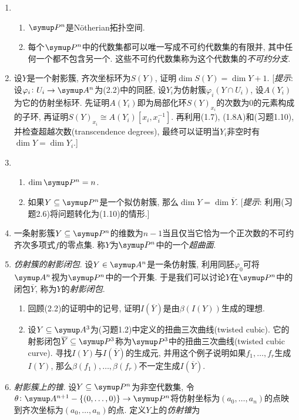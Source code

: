 \begin{enumerate}
\begin{enumerate}
        \end{enumerate}
    \item
        \begin{enumerate}
            \item $\Pn$是N\"otherian拓扑空间.
            \item 每个$\Pn$中的代数集都可以唯一写成不可约代数集的有限并, 其中任何一个都不包含另一个. 这些不可约代数集称为这个代数集的\emph{不可约分支}.
        \end{enumerate}
    \item 设$Y$是一个射影簇, 齐次坐标环为$S(Y)$, 证明$\dim S(Y) = \dim Y + 1$. [\emph{提示}: 设$\varphi_i\colon U_i\to \An$为(2.2)中的同胚, 设$Y_i$为仿射簇$\varphi_i(Y\cap U_i)$, 设$A(Y_i)$为它的仿射坐标环. 先证明$A(Y_i)$即为局部化环$S(Y)_{x_i}$的次数为0的元素构成的子环, 再证明$S(Y)_{x_i}\cong A(Y_i)[x_i, x_i^{-1}]$. 再利用(1.7), (1.8A)和(习题1.10), 并检查超越次数(transcendence degrees), 最终可以证明当$Y_i$非空时有$\dim Y = \dim Y_i$.]
    \item
        \begin{enumerate}
            \item $\dim \Pn = n$.
            \item 如果$Y\subseteq\Pn$是一个拟仿射簇, 那么$\dim Y = \dim \overline{Y}$. [\emph{提示}: 利用(习题2.6)将问题转化为(1.10)的情形.]
        \end{enumerate}
    \item 一条射影簇$Y\subseteq\Pn$的维数为$n-1$当且仅当它恰为一个正次数的不可约齐次多项式$f$的零点集. 称$Y$为$\Pn$中的一个\emph{超曲面}.
    \item \emph{仿射簇的射影闭包}. 设$Y\in\An$是一条仿射簇, 利用同胚$\varphi_0$可将$\An$视为$\Pn$中的一个开集. 于是我们可以讨论$Y$在$\Pn$中的闭包$\overline{Y}$, 称为$Y$的\emph{射影闭包}.
        \begin{enumerate}
            \item 回顾(2.2)的证明中的记号, 证明$I(\overline{Y})$是由$\beta(I(Y))$生成的理想.
            \item 设$Y\subseteq\AA{3}$为(习题1.2)中定义的扭曲三次曲线(twisted cubic). 它的射影闭包$\overline{Y}\subseteq\PP{3}$称为$\PP{3}$中的扭曲三次曲线(twisted cubic curve). 寻找$I(Y)$与$I(\overline{Y})$的生成元, 并用这个例子说明如果$f_1, \dotsc, f_r$生成$I(Y)$, 那么$\beta(f_1), \dotsc, \beta(f_r)$不一定生成$I(\overline{Y})$.
        \end{enumerate}
    \item \emph{射影簇上的锥}. 设$Y\subseteq\Pn$为非空代数集, 令$\theta\colon\AA{n+1}-\{(0, \dotsc, 0)\}\to\Pn$将仿射坐标为$(a_0, \dotsc, a_n)$的点映到齐次坐标为$(a_0, \dotsc, a_n)$的点. 定义$Y$上的\emph{仿射锥}为

\end{enumerate}
